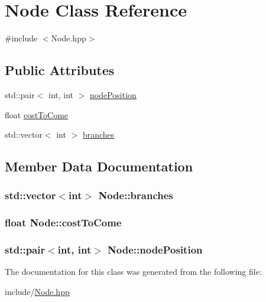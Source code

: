 \hypertarget{classNode}{}\section{Node Class Reference}
\label{classNode}


{\ttfamily \#include $<$Node.\+hpp$>$}

\subsection*{Public Attributes}
\begin{DoxyCompactItemize}
\item 
std\+::pair$<$ int, int $>$ \hyperlink{classNode_a9d7c1d9729c5e196ccf79ef026ce07bb}{node\+Position}
\item 
float \hyperlink{classNode_a4e05c65e3c90bddfaa1f2b24ee06949f}{cost\+To\+Come}
\item 
std\+::vector$<$ int $>$ \hyperlink{classNode_a9333024bcde28f35f8be06c0501c4d77}{branches}
\end{DoxyCompactItemize}


\subsection{Member Data Documentation}
\subsubsection[{\texorpdfstring{branches}{branches}}]{\setlength{\rightskip}{0pt plus 5cm}std\+::vector$<$int$>$ Node\+::branches}\hypertarget{classNode_a9333024bcde28f35f8be06c0501c4d77}{}\label{classNode_a9333024bcde28f35f8be06c0501c4d77}
\subsubsection[{\texorpdfstring{cost\+To\+Come}{costToCome}}]{\setlength{\rightskip}{0pt plus 5cm}float Node\+::cost\+To\+Come}\hypertarget{classNode_a4e05c65e3c90bddfaa1f2b24ee06949f}{}\label{classNode_a4e05c65e3c90bddfaa1f2b24ee06949f}
\subsubsection[{\texorpdfstring{node\+Position}{nodePosition}}]{\setlength{\rightskip}{0pt plus 5cm}std\+::pair$<$int, int$>$ Node\+::node\+Position}\hypertarget{classNode_a9d7c1d9729c5e196ccf79ef026ce07bb}{}\label{classNode_a9d7c1d9729c5e196ccf79ef026ce07bb}


The documentation for this class was generated from the following file\+:\begin{DoxyCompactItemize}
\item 
include/\hyperlink{Node_8hpp}{Node.\+hpp}\end{DoxyCompactItemize}
